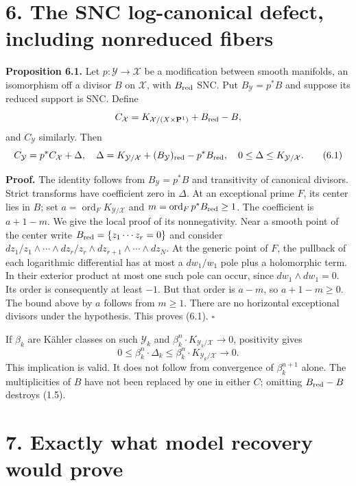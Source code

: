 \documentclass[
  11pt,
]{article}
\begin{document}
\section{6. The SNC log-canonical defect, including nonreduced
fibers}\label{the-snc-log-canonical-defect-including-nonreduced-fibers}

\textbf{Proposition 6.1.} Let \(p:\mathcal Y\to\mathcal X\) be a
modification between smooth manifolds, an isomorphism off a divisor
\(B\) on \(\mathcal X\), with \(B_{\rm red}\) SNC. Put
\(B_{\mathcal Y}=p^*B\) and suppose its reduced support is SNC. Define
\[
 C_{\mathcal X}=K_{\mathcal X/(X\times\mathbf P^1)}+B_{\rm red}-B,
\] and \(C_{\mathcal Y}\) similarly. Then \[
 C_{\mathcal Y}=p^*C_{\mathcal X}+\Delta,
 \quad\Delta=K_{\mathcal Y/\mathcal X}
       +(B_{\mathcal Y})_{\rm red}-p^*B_{\rm red},
 \quad 0\leq\Delta\leq K_{\mathcal Y/\mathcal X}.           \tag{6.1}
\]

\textbf{Proof.} The identity follows from \(B_{\mathcal Y}=p^*B\) and
transitivity of canonical divisors. Strict transforms have coefficient
zero in \(\Delta\). At an exceptional prime \(F\), its center lies in
\(B\); set \(a=\operatorname{ord}_FK_{\mathcal Y/\mathcal X}\) and
\(m=\operatorname{ord}_Fp^*B_{\rm red}\geq1\). The coefficient is
\(a+1-m\). We give the local proof of its nonnegativity. Near a smooth
point of the center write \(B_{\rm red}=\{z_1\cdots z_r=0\}\) and
consider
\(dz_1/z_1\wedge\cdots\wedge dz_r/z_r\wedge dz_{r+1}\wedge\cdots\wedge dz_N\).
At the generic point of \(F\), the pullback of each logarithmic
differential has at most a \(dw_1/w_1\) pole plus a holomorphic term. In
their exterior product at most one such pole can occur, since
\(dw_1\wedge dw_1=0\). Its order is consequently at least \(-1\). But
that order is \(a-m\), so \(a+1-m\geq0\). The bound above by \(a\)
follows from \(m\geq1\). There are no horizontal exceptional divisors
under the hypothesis. This proves (6.1). \(\square\)

If \(\beta_k\) are Kähler classes on such \(\mathcal Y_k\) and
\(\beta_k^n\cdot K_{\mathcal Y_k/\mathcal X}\to0\), positivity gives \[
 0\leq\beta_k^n\cdot\Delta_k
     \leq\beta_k^n\cdot K_{\mathcal Y_k/\mathcal X}\to0.     \tag{6.2}
\] This implication is valid. It does not follow from convergence of
\(\beta_k^{n+1}\) alone. The multiplicities of \(B\) have not been
replaced by one in either \(C\); omitting \(B_{\rm red}-B\) destroys
(1.5).

\section{7. Exactly what model recovery would
prove}\label{exactly-what-model-recovery-would-prove}
\end{document}
